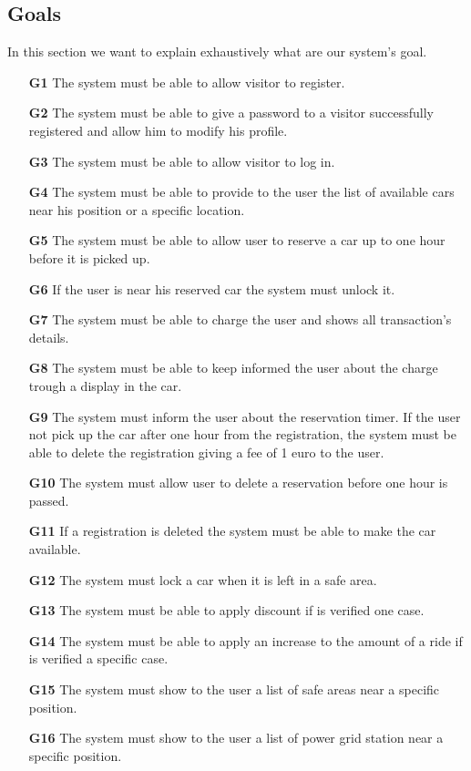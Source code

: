 \subsection{Goals} \label{subsec:goals}
In this section we want to explain exhaustively what are our system's goal.
\begin{itemize}
\item[\textbf{G1}] The system must be able to allow visitor to register.
\item[\textbf{G2}] The system must be able to give a password to a visitor successfully registered and allow him to modify his profile.
\item[\textbf{G3}] The system must be able to allow visitor to log in.
\item[\textbf{G4}] The system must be able to provide to the user the list of available cars near his position or a specific location.
\item[\textbf{G5}] The system must be able to allow user to reserve a car up to one hour before it is picked up.
\item[\textbf{G6}] If the user is near his reserved car the system must unlock it.
\item[\textbf{G7}] The system must be able to charge the user and shows all transaction's details.
\item[\textbf{G8}] The system must be able to keep informed the user about the charge trough a display in the car.
\item[\textbf{G9}] The system must inform the user about the reservation timer. If the user not pick up the car after one hour from the registration, the system must be able to delete the registration giving a fee of 1 euro to the user.
\item[\textbf{G10}] The system must allow user to delete a reservation before one hour is passed.
\item[\textbf{G11}] If a registration is deleted the system must be able to make the car available.
\item[\textbf{G12}] The system must lock a car when it is left in a safe area.
\item[\textbf{G13}] The system must be able to apply discount if is verified one case.
\item[\textbf{G14}] The system must be able to apply an increase to the amount of a ride if is verified a specific case.
\item[\textbf{G15}] The system must show to the user a list of safe areas near a specific position.
\item[\textbf{G16}] The system must show to the user a list of power grid station near a specific position.


\end{itemize}


